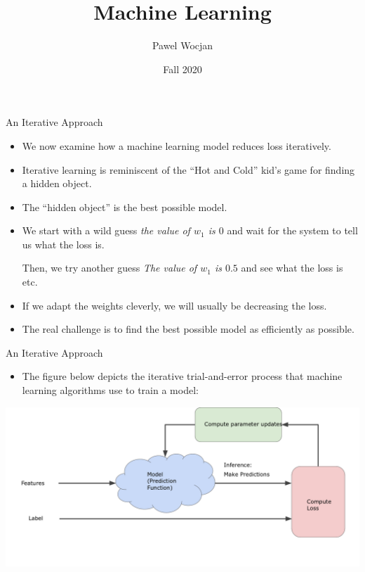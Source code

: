\documentclass{beamer}
\title[ML]{Machine Learning}
\author{Pawel Wocjan}
\institute{University of Central Florida}
\date{Fall 2020}
\begin{document}
\begin{frame}
  \titlepage
\end{frame}

\begin{frame}{An Iterative Approach}

\begin{itemize}
\item We now examine how a machine learning model reduces loss iteratively.

\medskip    
\item Iterative learning is reminiscent of the ``Hot and Cold'' kid's game for finding a hidden object. 

\medskip    
\item The ``hidden object'' is the best possible model. 

\medskip    
\item We start with a wild guess \emph{the value of $w_1$ is $0$} and wait for the system to tell us what the loss is. 
    
\medskip
Then, we try another guess \emph{The value of $w_1$ is $0.5$} and see what the loss is etc.
    
\medskip
\item If we adapt the weights cleverly, we will usually be decreasing the loss. 

\medskip
\item The real challenge is to find the best possible model as efficiently as possible.
\end{itemize}

\end{frame}


\begin{frame}{An Iterative Approach}
\begin{itemize}
    \item The figure below depicts the iterative trial-and-error process that machine learning algorithms use to train a model:
\end{itemize}

\bigskip
\includegraphics[width=\textwidth]{images/GradientDescentDiagram.png}
\end{frame}
\end{document}
